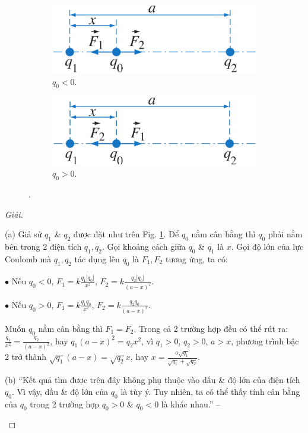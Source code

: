 \documentclass[oneside]{book}
\numberwithin{equation}{section}
\begin{document}
\begin{figure}[H]
	\centering
	\begin{subfigure}{.5\textwidth}
		\centering
		\includegraphics[width=.45\linewidth]{3_dien_tich_thang_hang_a}
		\caption{$q_0 < 0$.}
	\end{subfigure}%
	\begin{subfigure}{.5\textwidth}
		\centering
		\includegraphics[width=.45\linewidth]{3_dien_tich_thang_hang_b}
		\caption{$q_0 > 0$.}
	\end{subfigure}
	\caption{\cite[Hình 5.1, p. 5.1]{SGK_Vat_Ly_11_nang_cao}.}
	\label{fig:3 dien tich thang hang}
\end{figure}

\begin{proof}[Giải]
	\begin{enumerate*}
		\item[(a)] Giả sử $q_1$ \& $q_2$ được đặt như trên Fig. \ref{fig:3 dien tich thang hang}. Để $q_0$ nằm cân bằng thì $q_0$ phải nằm bên trong 2 điện tích $q_1,q_2$. Gọi khoảng cách giữa $q_0$ \& $q_1$ là $x$. Gọi độ lớn của lực Coulomb mà $q_1,q_2$ tác dụng lên $q_0$ là $F_1,F_2$ tương ứng, ta có:
		\begin{enumerate*}
			\item[$\bullet$] Nếu $q_0 < 0$, $F_1 = k\frac{q_1|q_0|}{x^2}$, $F_2 = k\frac{q_2|q_0|}{(a - x)^2}$.
			\item[$\bullet$] Nếu $q_0 > 0$, $F_1 = k\frac{q_1q_0}{x^2}$, $F_2 = k\frac{q_2q_0}{(a - x)^2}$.
		\end{enumerate*}
		Muốn $q_0$ nằm cân bằng thì $F_1 = F_2$. Trong cả 2 trường hợp đều có thể rút ra: $\frac{q_1}{x^2} = \frac{q_2}{(a - x)^2}$, hay $q_1(a - x)^2 = q_2x^2$, vì $q_1 > 0$, $q_2 > 0$, $a > x$, phương trình bậc 2 trở thành $\sqrt{q_1}(a - x) = \sqrt{q_2}x$, hay $x = \frac{a\sqrt{q_1}}{\sqrt{q_1} + \sqrt{q_2}}$.
		\item[(b)] ``Kết quả tìm được trên đây không phụ thuộc vào dấu \& độ lớn của điện tích $q_0$. Vì vậy, dấu \& độ lớn của $q_0$ là tùy ý. Tuy nhiên, ta có thể thấy tính cân bằng của $q_0$ trong 2 trường hợp $q_0 > 0$ \& $q_0 < 0$ là khác nhau.'' -- \cite[p. 25]{SGK_Vat_Ly_11_nang_cao}
	\end{enumerate*}
\end{proof}
\end{document}
